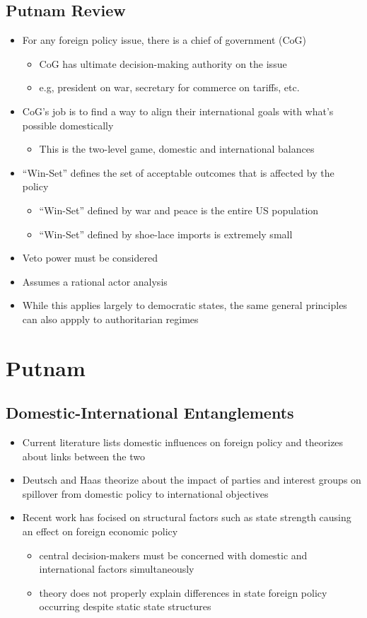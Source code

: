 \documentclass[11pt]{article}
\begin{document}
\subsection{Putnam Review}
\label{sec:org2436fba}
\begin{itemize}
\item For any foreign policy issue, there is a chief of government (CoG)
\begin{itemize}
\item CoG has ultimate decision-making authority on the issue
\item e.g, president on war, secretary for commerce on tariffs, etc.
\end{itemize}
\item CoG's job is to find a way to align their international goals with what's possible domestically
\begin{itemize}
\item This is the two-level game, domestic and international balances
\end{itemize}
\item ``Win-Set'' defines the set of acceptable outcomes that is affected by the policy
\begin{itemize}
\item ``Win-Set'' defined by war and peace is the entire US population
\item ``Win-Set'' defined by shoe-lace imports is extremely small
\end{itemize}
\item Veto power must be considered
\item Assumes a rational actor analysis
\item While this applies largely to democratic states, the same general principles can also appply to authoritarian regimes
\end{itemize}
\section{Putnam}
\label{sec:orge942289}
\subsection{Domestic-International Entanglements}
\label{sec:org363ba44}
\begin{itemize}
\item Current literature lists domestic influences on foreign policy and theorizes about links between the two
\item Deutsch and Haas theorize about the impact of parties and interest groups on spillover from domestic policy to international objectives
\item Recent work has focised on structural factors such as state strength causing an effect on foreign economic policy
\begin{itemize}
\item central decision-makers must be concerned with domestic and international factors simultaneously
\item theory does not properly explain differences in state foreign policy occurring despite static state structures
\end{itemize}
\end{itemize}
\end{document}
